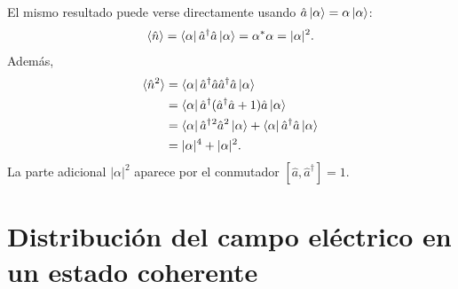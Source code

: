 \documentclass[11pt]{article}
\newcommand{\adag}{\hat a^\dagger}
\begin{document}
El mismo resultado puede verse directamente usando
$\hat a\ket\alpha=\alpha\ket\alpha$:
\begin{equation}
  \langle\hat n\rangle
  =
  \bra\alpha\adag\hat a\ket\alpha
  =
  \alpha^*\alpha
  =
  |\alpha|^2.
\end{equation}
Adem\'as,
\begin{align}
  \langle\hat n^2\rangle
  &=
  \bra\alpha\adag\hat a\adag\hat a\ket\alpha \notag\\
  &=
  \bra\alpha\adag(\adag\hat a+1)\hat a\ket\alpha \notag\\
  &=
  \bra\alpha\adag{}^2\hat a^2\ket\alpha
  +
  \bra\alpha\adag\hat a\ket\alpha \notag\\
  &=
  |\alpha|^4+|\alpha|^2.
\end{align}
La parte adicional $|\alpha|^2$ aparece por el conmutador
$[\hat a,\adag]=1$.

\section{Distribuci\'on del campo el\'ectrico en un estado coherente}
\end{document}
